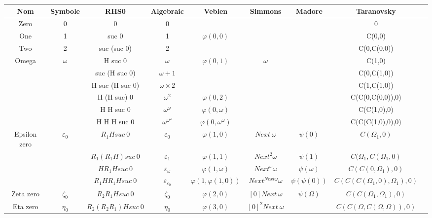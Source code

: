 \documentclass[8pt]{article}
\begin{document}
\begin{tabular}{|c|c|c|c|c|c|c|c|c|}
\hline
Nom		& Symbole		& RHS0 		& Algebraic			& Veblen			& Simmons			& Madore				& Taranovsky 			\\
\hline
Zero		& 0			& 0			& 0				& 				& 				& 					& 0				\\ \hline
One		& 1			& suc 0			& 1				& \(\varphi(0,0)\)		& 				& 					& C(0,0)			\\ \hline
Two		& 2			& suc (suc 0)		& 2				& 				& 				& 					& C(0,C(0,0))			\\ \hline
Omega		& \(\omega\)		& H suc 0		& \(\omega\)			& \(\varphi(0,1)\)		& \(\omega\)			& 					& C(1,0)			\\ \hline
		& 			& suc (H suc 0)		& \(\omega+1\)			& 				& 				& 					& C(0,C(1,0))			\\ \hline
		&			& H suc (H suc 0)	& \(\omega\times2\)		&				& 				& 					& C(1,C(1,0))			\\ \hline
		&			& H (H suc) 0		& \(\omega^2\)			& \(\varphi(0,2)\)		& 				& 					& C(C(0,C(0,0)),0)		\\ \hline
		&			& H H suc 0		& \(\omega^\omega\)		& \(\varphi(0,\omega)\)		& 				& 					& C(C(1,0),0)			\\ \hline
		&			& H H H suc 0		& \(\omega^{\omega^\omega}\)	& \(\varphi(0,\omega^\omega)\)	&				&					& C(C(C(1,0),0),0)		\\ \hline
Epsilon zero	& \(\varepsilon_0\)	& \(R_1 H suc\ 0\)	& \(\varepsilon_0\)		& \(\varphi(1,0)\)		& \(Next\ \omega\)		& \(\psi(0)\)				& \(C(\Omega_1,0)\)		\\ \hline
		& 			& \(R_1 (R_1 H) suc\ 0\)& \(\varepsilon_1\)		& \(\varphi(1,1)\)		& \(Next^2 \omega\)	& \(\psi(1)\)				& \(C(\Omega_1,C(\Omega_1,0)\)	\\ \hline
		& 			& \(H R_1 H suc\ 0\)	& \(\varepsilon_\omega\)	& \(\varphi(1,\omega)\) 	& \(Next^\omega \omega\) & \(\psi(\omega)\)			& \(C(C(0,\Omega_1),0)\)	\\ \hline
		& 			& \(R_1 H R_1 H suc\ 0\)&\(\varepsilon_{\varepsilon_0}\)& \(\varphi(1,\varphi(1,0))\)	& \(Next^{Next \omega} \omega \) & \(\psi(\psi(0))\)			& \(C(C(C(\Omega_1,0),\Omega_1),0)\)\\ \hline
Zeta zero	& \(\zeta_0\)		& \(R_2 R_1 H suc\ 0\)	& \(\zeta_0\)			& \(\varphi(2,0)\)		& \([0] Next\ \omega\)		& \(\psi(\Omega)\)			& \(C(C(\Omega_1,\Omega_1),0)\)	\\ \hline
Eta zero	& \(\eta_0\)		& \(R_2 (R_2 R_1) H suc\ 0\)& \(\eta_0\)			& \(\varphi(3,0)\)		& \([0]^2 Next\ \omega\) 	&					& \(C(C(\Omega,C(\Omega,\Omega)),0)\) \\ \hline

\end{tabular}
\end{document}
